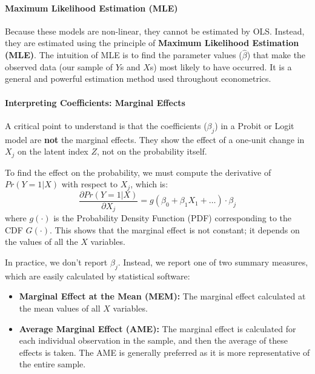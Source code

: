 \documentclass{article}
\providecommand{\tightlist}{
  \setlength{\itemsep}{0pt}
  \setlength{\parskip}{0pt}}
\begin{document}
\paragraph{Maximum Likelihood Estimation (MLE)}
Because these models are non-linear, they cannot be estimated by OLS. Instead, they are estimated using the principle of \textbf{Maximum Likelihood Estimation (MLE)}. The intuition of MLE is to find the parameter values ($\hat{\beta}$) that make the observed data (our sample of $Y$s and $X$s) most likely to have occurred. It is a general and powerful estimation method used throughout econometrics.

\paragraph{Interpreting Coefficients: Marginal Effects}
A critical point to understand is that the coefficients ($\beta_j$) in a Probit or Logit model are \textbf{not} the marginal effects. They show the effect of a one-unit change in $X_j$ on the latent index $Z$, not on the probability itself.

To find the effect on the probability, we must compute the derivative of $Pr(Y=1|X)$ with respect to $X_j$, which is:
\begin{equation}
    \frac{\partial Pr(Y=1|X)}{\partial X_j} = g(\beta_0 + \beta_1 X_1 + \dots) \cdot \beta_j
\end{equation}
where $g(\cdot)$ is the Probability Density Function (PDF) corresponding to the CDF $G(\cdot)$. This shows that the marginal effect is not constant; it depends on the values of all the $X$ variables.

In practice, we don't report $\beta_j$. Instead, we report one of two summary measures, which are easily calculated by statistical software:
\begin{itemize}
    \tightlist
    \item \textbf{Marginal Effect at the Mean (MEM):} The marginal effect calculated at the mean values of all $X$ variables.
    \item \textbf{Average Marginal Effect (AME):} The marginal effect is calculated for each individual observation in the sample, and then the average of these effects is taken. The AME is generally preferred as it is more representative of the entire sample.
\end{itemize}
\end{document}
